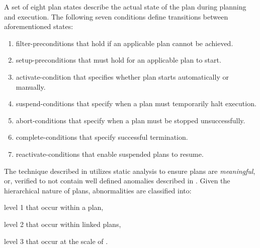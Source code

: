 A set of eight plan states describe the actual state of the plan during
planning and execution. The following seven conditions define transitions
between aforementioned states:
\begin{enumerate}[label=\arabic*)]
  \item filter-preconditions that hold if an applicable plan cannot be achieved.
  \item setup-preconditions that must hold for an applicable plan to start.
  \item activate-condition that specifies whether plan starts automatically or
    manually.
  \item suspend-conditions that specify when a plan must temporarily halt execution.
  \item abort-conditions that specify when a plan must be stopped unsuccessfully.
  \item complete-conditions that specify successful termination.
  \item reactivate-conditions that enable suspended plans to resume.
\end{enumerate}

The technique described in \cite{DuftschmidAIM01} utilizes static analysis
to ensure plans are \emph{meaningful}, or, verified to not contain well defined
anomalies described in \cite{PreeceJIS94}. Given the hierarchical nature of plans, abnormalities
are classified into:
\begin{enumerate*}[label=(\alph*)]
  \item level 1 that occur within a plan,
  \item level 2 that occur within linked plans,
  \item level 3 that occur at the scale of \BPGs{}.
\end{enumerate*}

